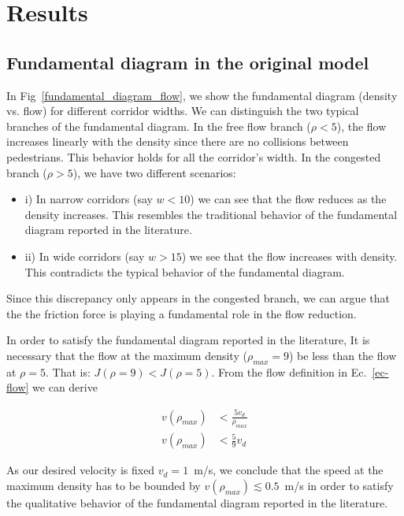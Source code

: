 \section{\label{results}Results}

\subsection{Fundamental diagram in the original model}

In Fig~\ref{fundamental_diagram_flow}, we show the fundamental diagram (density vs. flow) for different corridor widths. We can distinguish the two typical branches of the fundamental diagram. In the free flow branch ($\rho < 5$), the flow increases linearly with the density since there are no collisions between pedestrians. This behavior holds for all the corridor's width. In the congested branch ($\rho > 5$), we have two different scenarios:


\begin{itemize}
\item i) In narrow corridors (say $w < 10$) we can see that the flow reduces as the density increases. This resembles the traditional behavior of the fundamental diagram reported in the literature. 
\item ii) In wide corridors (say $w > 15$) we see that the flow increases with density. This contradicts the typical behavior of the fundamental diagram.   
\end{itemize}

Since this discrepancy only appears in the congested branch, we can argue that the the friction force is playing a fundamental role in the flow reduction.  

In order to satisfy the fundamental diagram reported in the literature, It is necessary that the flow at the maximum density ($\rho_{max} = 9$) be less than the flow at $\rho = 5$. That is:  $J(\rho = 9) < J(\rho = 5)$. From the flow definition in Ec.~\ref{ec-flow} we can derive

\begin{align*} 
v(\rho_{max}) &< \frac{5v_d}{\rho_{max}} \\
v(\rho_{max}) &< \frac{5}{9} v_d
\end{align*}


As our desired velocity is fixed $v_d = 1$~m/s, we conclude that the speed at the maximum density has to be bounded by $v(\rho_{max}) \lesssim 	0.5$~m/s in order to satisfy the qualitative behavior of the fundamental diagram reported in the literature.

